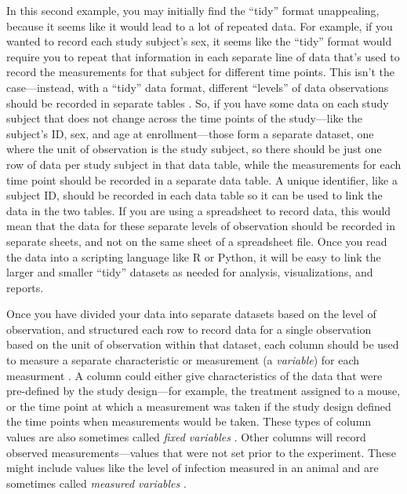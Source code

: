 \documentclass[]{tufte-book}
\begin{document}
In this second example, you may initially find the ``tidy'' format unappealing,
because it seems like it would lead to a lot of repeated data. For example, if
you wanted to record each study subject's sex, it seems like the ``tidy'' format
would require you to repeat that information in each separate line of data
that's used to record the measurements for that subject for different time
points. This isn't the case---instead, with a ``tidy'' data format, different
``levels'' of data observations should be recorded in separate tables \citep{wickham2014tidy}.
So, if you have some data on each study subject that does not change across the
time points of the study---like the subject's ID, sex, and age at
enrollment---those form a separate dataset, one where the unit of observation is
the study subject, so there should be just one row of data per study subject in
that data table, while the measurements for each time point should be recorded
in a separate data table. A unique identifier, like a subject ID, should be
recorded in each data table so it can be used to link the data in the two
tables. If you are using a spreadsheet to record data, this would mean that the
data for these separate levels of observation should be recorded in separate
sheets, and not on the same sheet of a spreadsheet file. Once you read the data
into a scripting language like R or Python, it will be easy to link the larger
and smaller ``tidy'' datasets as needed for analysis, visualizations, and reports.

Once you have divided your data into separate datasets based on the level of
observation, and structured each row to record data for a single observation
based on the unit of observation within that dataset, each column should be used
to measure a separate characteristic or measurement (a \emph{variable}) for each
measurment \citep{wickham2014tidy}. A column could either give characteristics of the data
that were pre-defined by the study design---for example, the treatment assigned
to a mouse, or the time point at which a measurement was taken if the study
design defined the time points when measurements would be taken. These types of
column values are also sometimes called \emph{fixed variables} \citep{wickham2014tidy}. Other
columns will record observed measurements---values that were not set prior to
the experiment. These might include values like the level of infection measured
in an animal and are sometimes called \emph{measured variables} \citep{wickham2014tidy}.
\end{document}
